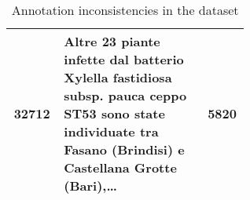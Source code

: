 \begin{table}[!htbp]
\begin{tabular}{|c|p{0.6\linewidth}|c|}
    32712 & Altre 23 piante infette dal batterio Xylella fastidiosa subsp. pauca ceppo ST53 sono state individuate tra Fasano (Brindisi) e Castellana Grotte (Bari),\ldots %
    & 5820 \\
    \hline
  \end{tabular}
  \caption{Annotation inconsistencies in the \VSI{} dataset}
  \label{tab:04_annotation_inconsistencies}
\end{table}

